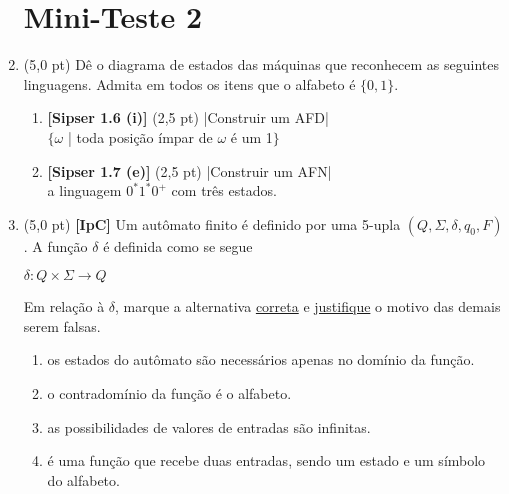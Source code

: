 \documentclass[12pt,a4paper,oneside]{article}
\begin{document}
\begin{enumerate}
	\section*{Mini-Teste 2}

\item (5,0 pt) Dê o diagrama de estados das máquinas que reconhecem as seguintes linguagens. Admita em todos os itens que o alfabeto é  $\{0,1\}$.
\begin{enumerate}
	\item {\bf [Sipser 1.6 (i)]} (2,5 pt) |Construir um AFD| \\$\{\omega$ | toda posição ímpar de $\omega$ é um 1$\}$
	\item {\bf [Sipser 1.7 (e)]} (2,5 pt) |Construir um AFN| 
	\\a linguagem $0^*1^*0^+$ com três estados.
\end{enumerate}

\item (5,0 pt) {\bf [IpC]}
Um autômato finito é definido por uma 5-upla $(Q, \Sigma, \delta, q_0, F)$. A função $\delta$ é definida como se segue
\begin{center}
	$\delta:Q \times \Sigma \rightarrow Q$
\end{center}
Em relação à $\delta$, marque a alternativa \underline{correta} e \underline{justifique} o motivo das demais serem falsas.

\begin{enumerate}
	\item os estados do autômato são necessários apenas no domínio da função.
	\item o contradomínio da função é o alfabeto.
	\item as possibilidades de valores de entradas são infinitas.
	\item é uma função que recebe duas entradas, sendo um estado e um símbolo do alfabeto.
\end{enumerate}


\end{enumerate}
\end{document}
